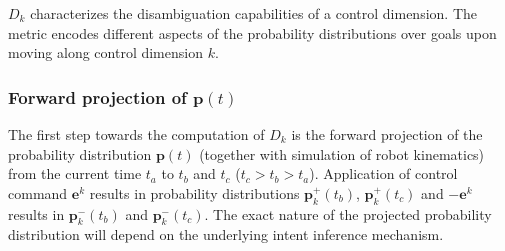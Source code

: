 $D_k$ characterizes the disambiguation capabilities of a control dimension. The metric encodes different aspects of the probability distributions over goals upon moving along control dimension $k$. 

\subsubsection{Forward projection of $\boldsymbol{p}(t)$}
The first step towards the computation of $D_k$ is the forward projection of the probability distribution $\boldsymbol{p}(t)$ (together with simulation of robot kinematics) from the current time $t_a$ to $t_b$ and $t_c$ ($t_c > t_b > t_a$). Application of control command $\boldsymbol{e}^k$ results in probability distributions $\boldsymbol{p}^+_k(t_b)$, $\boldsymbol{p}^+_k(t_c)$ and $-\boldsymbol{e}^k$ results in $\boldsymbol{p}^-_k(t_b)$ and $\boldsymbol{p}^-_k(t_c)$. The exact nature of the projected probability distribution will depend on the underlying intent inference mechanism. 

